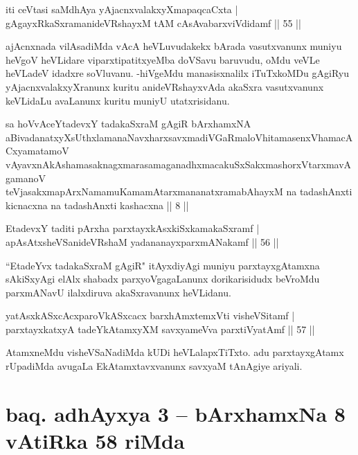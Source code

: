 \begin{shl}
iti ceVtasi saMdhAya yAjacnxvalakxyXmapaqcaCxta |\\
gAgayxRkaSxramanideVRshayxM tAM cAsAvabarxviVdidamf \hfill || 55 ||
\end{shl}

\begin{artha}
ajAcnxnada vilAsadiMda vAcA heVLuvudakekx bArada vasutxvanunx muniyu heVgoV heVLidare viparxtipatitxyeMba doVSavu baruvudu, oMdu veVLe heVLadeV idadxre soVluvanu. -hiVgeMdu manasisxnalilx iTuTxkoMDu gAgiRyu yAjacnxvalakxyXranunx kuritu anideVRshayxvAda akaSxra vasutxvanunx keVLidaLu avaLanunx kuritu muniyU utatxrisidanu.
\end{artha}

\begin{shl}
sa hoVvAceYtadevxY tadakaSxraM gAgiR bArxhamxNA aBivadanatxyXsUthxlamanaNavxharxsavxmadiVGaRmaloVhitamasenxVhamacACxyamatamoV\s \\ vAyavxnAkAshamasaknagxmarasamaganadhxmacakuSxSakxmashorxVtarxmavAgamanoV\s\\ teVjasakxmapArxNamamuKamamAtarxmananatxramabAhayxM na tadashAnxti kicnacxna na tadashAnxti kashacxna || 8 ||
\end{shl}

\begin{shl}
EtadevxY taditi pArxha parxtayxkAsxkiSxkamakaSxramf |\\
apAsAtxsheVSanideVRshaM yadananayxparxmANakamf \hfill || 56 ||
\end{shl}

\begin{artha}
``EtadeYvx tadakaSxraM gAgiR" itAyxdiyAgi muniyu parxtayxgAtamxna sAkiSxyAgi elAlx shabadx parxyoVgagaLanunx dorikarisidudx beVroMdu parxmANavU ilalxdiruva akaSxravanunx heVLidanu.
\end{artha}

\begin{shl}
yatAsxkASxcAcxparoVkASxcacx barxhAmxtemxVti visheVSitamf |\\
parxtayxkatxyA tadeYkAtamxyXM savxyameVva parxtiVyatAmf \hfill || 57 ||
\end{shl}

\begin{artha}
AtamxneMdu visheVSaNadiMda kUDi heVLalapxTiTxto. adu parxtayxgAtamx rUpadiMda avugaLa EkAtamxtavxvanunx savxyaM tAnAgiye ariyali.
\end{artha}%

\section*{baq. adhAyxya 3 -- bArxhamxNa 8 vAtiRka 58 riMda}

